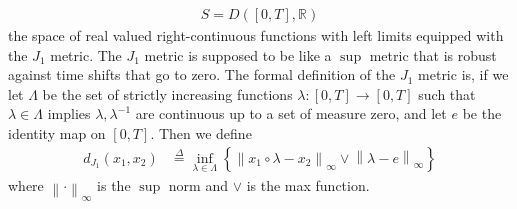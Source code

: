 \documentclass[12pt]{article}
\newcommand{\R}{\mathbb{R}}
\newcommand\norm[1]{\left\lVert#1\right\rVert}
\newcommand{\define}{\overset{\Delta}{=}}
\theoremstyle{definition}
\theoremstyle{definition}
\theoremstyle{definition}
\begin{document}
\begin{align*}
S=D([0,T],\R)
\end{align*}
the space of real valued right-continuous functions with left limits equipped with the $J_1$ metric. The $J_1$ metric is supposed to be like a $\sup$ metric that is robust against time shifts that go to zero. The formal definition of the $J_1$ metric is, if we let $\Lambda$ be the set of strictly increasing functions $\lambda:[0,T]\rightarrow [0,T]$ such that $\lambda\in \Lambda$ implies $\lambda,\lambda^{-1}$ are continuous up to a set of measure zero, and let $e$ be the identity map on $[0,T]$. Then we define
\begin{align*}
d_{J_1}(x_1,x_2)&\define\inf_{\lambda\in \Lambda}\left\{\norm{x_1\circ \lambda -x_2}_{\infty}\lor \norm{\lambda-e}_{\infty}\right\}
\end{align*}
where $\norm{\cdot}_{\infty}$ is the $\sup$ norm and $\lor$ is the max function.\\
\end{document}
